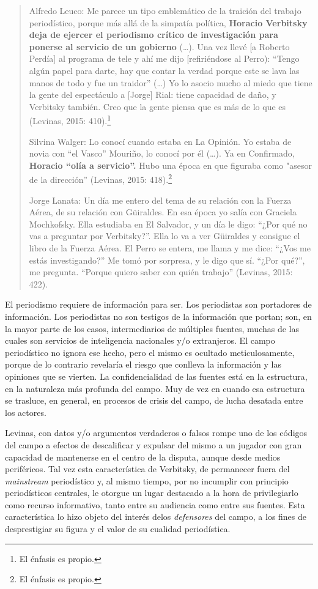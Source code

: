 \begin{quote}
Alfredo Leuco: Me parece un tipo emblemático de la traición del trabajo periodístico, porque más allá de la simpatía política, \textbf{Horacio Verbitsky deja de ejercer el periodismo crítico de investigación para ponerse al servicio de un gobierno} (\ldots). Una vez llevé {[}a Roberto Perdía{]} al programa de tele y ahí me dijo {[}refiriéndose al Perro): ``Tengo algún papel para darte, hay que contar la verdad porque este se lava las manos de todo y fue un traidor'' (\ldots) Yo lo asocio mucho al miedo que tiene la gente del espectáculo a {[}Jorge{]} Rial: tiene capacidad de daño, y Verbitsky también. Creo que la gente piensa que es más de lo que es (Levinas, 2015: 410).\footnote{El énfasis es propio.}

Silvina Walger: Lo conocí cuando estaba en La Opinión. Yo estaba de novia con ``el Vasco'' Mouriño, lo conocí por él (\ldots). Ya en Confirmado, \textbf{Horacio ``olía a servicio''.} Hubo una época en que figuraba como "asesor de la dirección'' (Levinas, 2015: 418).\footnote{El énfasis es propio.}

Jorge Lanata: Un día me entero del tema de su relación con la Fuerza Aérea, de su relación con Güiraldes. En esa época yo salía con Graciela Mochkofsky. Ella estudiaba en El Salvador, y un día le digo: ``¿Por qué no vas a preguntar por Verbitsky?''. Ella lo va a ver Güiraldes y consigue el libro de la Fuerza Aérea. El Perro se entera, me llama y me dice: ``¿Vos me estás investigando?'' Me tomó por sorpresa, y le digo que sí. ``¿Por qué?'', me pregunta. ``Porque quiero saber con quién trabajo'' (Levinas, 2015: 422).
\end{quote}

El periodismo requiere de información para ser. Los periodistas son portadores de información. Los periodistas no son testigos de la información que portan; son, en la mayor parte de los casos, intermediarios de múltiples fuentes, muchas de las cuales son servicios de inteligencia nacionales y/o extranjeros. El campo periodístico no ignora ese hecho, pero el mismo es ocultado meticulosamente, porque de lo contrario revelaría el riesgo que conlleva la información y las opiniones que se vierten. La confidencialidad de las fuentes está en la estructura, en la naturaleza más profunda del campo. Muy de vez en cuando esa estructura se trasluce, en general, en procesos de crisis del campo, de lucha desatada entre los actores.

Levinas, con datos y/o argumentos verdaderos o falsos rompe uno de los códigos del campo a efectos de descalificar y expulsar del mismo a un jugador con gran capacidad de mantenerse en el centro de la disputa, aunque desde medios periféricos. Tal vez esta característica de Verbitsky, de permanecer fuera del \emph{mainstream} periodístico y, al mismo tiempo, por no incumplir con principio periodísticos centrales, le otorgue un lugar destacado a la hora de privilegiarlo como recurso informativo, tanto entre su audiencia como entre sus fuentes. Esta característica lo hizo objeto del interés delos \emph{defensores} del campo, a los fines de desprestigiar su figura y el valor de su cualidad periodística.

